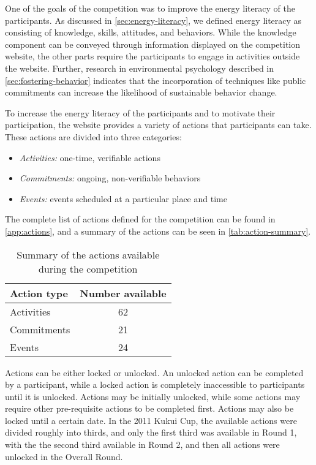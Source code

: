 One of the goals of the competition was to improve the energy literacy of the participants. As discussed in \autoref{sec:energy-literacy}, we defined energy literacy as consisting of knowledge, skills, attitudes, and behaviors. While the knowledge component can be conveyed through information displayed on the competition website, the other parts require the participants to engage in activities outside the website. Further, research in environmental psychology described in \autoref{sec:fostering-behavior} indicates that the incorporation of techniques like public commitments can increase the likelihood of sustainable behavior change.

To increase the energy literacy of the participants and to motivate their participation, the website provides a variety of actions that participants can take. These actions are divided into three categories:

\begin{itemize}
	\item \emph{Activities:} one-time, verifiable actions
	\item \emph{Commitments:} ongoing, non-verifiable behaviors
	\item \emph{Events:} events scheduled at a particular place and time
\end{itemize}

The complete list of actions defined for the competition can be found in \autoref{app:actions}, and a summary of the actions can be seen in \autoref{tab:action-summary}.

\begin{table}[htbp]
	\centering
		\begin{tabular}{| l | c |}
			\hline
			Action type & Number available \tabularnewline \hline \hline
			Activities & 62 \\
			Commitments & 21 \\
			Events & 24 \\ \hline
		\end{tabular}
	\caption{Summary of the actions available during the competition}
\label{tab:action-summary}
\end{table}

Actions can be either locked or unlocked. An unlocked action can be completed by a participant, while a locked action is completely inaccessible to participants until it is unlocked. Actions may be initially unlocked, while some actions may require other pre-requisite actions to be completed first. Actions may also be locked until a certain date. In the 2011 Kukui Cup, the available actions were divided roughly into thirds, and only the first third was available in Round 1, with the the second third available in Round 2, and then all actions were unlocked in the Overall Round.

